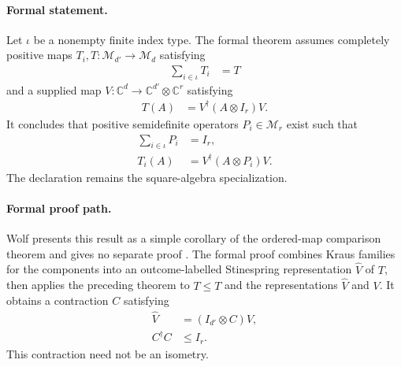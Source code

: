 \documentclass{article}
\begin{document}
\paragraph{Formal statement.}
Let $\iota$ be a nonempty finite index type. The formal theorem assumes
completely positive maps
$T_i,T:\mathcal M_{d'}\to\mathcal M_d$ satisfying
\begin{align}
    \sum_{i\in\iota}T_i
        &=T
    \label{eq:wolf_lecture_notes_errata_radon_nikodym_map_sum}
\end{align}
and a supplied map
$V:\mathbb C^d\to\mathbb C^{d'}\otimes\mathbb C^r$ satisfying
\begin{align}
    T(A)
        &=V^\dagger(A\otimes I_r)V.
    \label{eq:wolf_lecture_notes_errata_radon_nikodym_total_dilation}
\end{align}
It concludes that positive semidefinite operators
$P_i\in\mathcal M_r$ exist such that
\begin{align}
    \sum_{i\in\iota}P_i
        &=I_r,
    \label{eq:wolf_lecture_notes_errata_radon_nikodym_effect_sum}\\
    T_i(A)
        &=V^\dagger(A\otimes P_i)V.
    \label{eq:wolf_lecture_notes_errata_radon_nikodym_component_formula}
\end{align}
The declaration  remains the
square-algebra specialization.

\paragraph{Formal proof path.}
Wolf presents this result as a simple corollary of the ordered-map comparison
theorem and gives no separate proof \cite[Theorem~2.4]{Wolf2012Quantum}. The
formal proof combines Kraus families for the components into an
outcome-labelled Stinespring representation $\widehat V$ of $T$, then applies
the preceding theorem to $T\leq T$ and the representations $\widehat V$ and
$V$. It obtains a contraction $C$ satisfying
\begin{align}
    \widehat V
        &=(I_{d'}\otimes C)V,
    \label{eq:wolf_lecture_notes_errata_radon_nikodym_contraction_factorization}\\
    C^\dagger C
        &\leq I_r.
    \label{eq:wolf_lecture_notes_errata_radon_nikodym_contraction_bound}
\end{align}
This contraction need not be an isometry.
\end{document}
